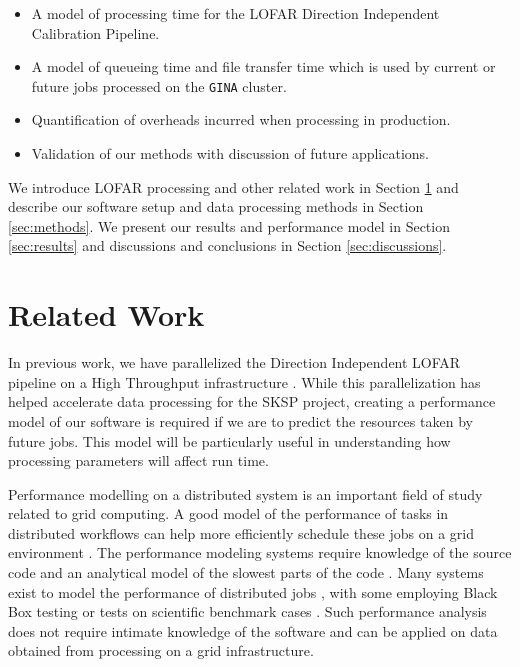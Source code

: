 \documentclass[preprint,5p]{elsarticle}
\begin{document}
\begin{itemize}
    \item A model of processing time for the  LOFAR Direction Independent Calibration Pipeline.
    \item A model of queueing time and file transfer time which is used by current or future jobs processed on the \texttt{GINA} cluster.
    \item Quantification of overheads incurred when processing in production. 
    \item Validation of our methods with discussion of future applications. 
\end{itemize}

We introduce LOFAR processing and other related work in Section \ref{sec:related} and describe our software setup and data processing methods in Section \ref{sec:methods}. We present our results and performance model in Section \ref{sec:results} and discussions and conclusions in Section \ref{sec:discussions}. 


\section{Related Work}\label{sec:related}
In previous work, we have parallelized the Direction Independent LOFAR pipeline on a High Throughput infrastructure \citep{mechev17}. While this parallelization has helped accelerate data processing for the SKSP project, creating a performance model of our software is required if we are to predict the resources taken by future jobs. This model will be particularly useful in understanding how processing parameters will affect run time.  

Performance modelling on a distributed system is an important field of study related to grid computing. A good model of the performance of tasks in distributed workflows can help more efficiently schedule these jobs on a grid environment \citep{grid_perform_model}. The performance modeling systems require knowledge of the source code and an analytical model of the slowest parts of the code \citep{semi_analytical_model}. Many systems exist to model the performance of distributed jobs \citep{barnes2008regression, semi_analytical_model,performance_prediction,Witt2018PredictivePM}, with some employing Black Box testing \citep{cross_platform_black_box, mapreduce_analysis} or tests on scientific benchmark cases \citep{synthetic_memory_prediction}. Such performance analysis does not require intimate knowledge of the software and can be applied on data obtained from processing on a grid infrastructure.
\end{document}

